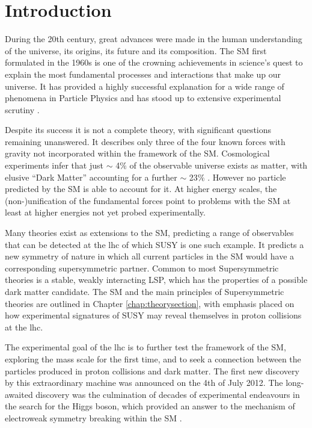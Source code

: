 \chapter{Introduction}
\label{chap:introduction}

During the 20th century, great advances were made in the human understanding of the universe, its origins, its future and its composition. The \acf{SM} first formulated in the 1960s is one of the crowning achievements in science's quest to explain the most fundamental processes and interactions that make up our universe. It has provided a highly successful explanation for a wide range of phenomena in Particle Physics and has stood up to extensive experimental scrutiny \cite{pdg2012}.

Despite its success it is not  a complete theory, with significant questions remaining unanswered. It describes only three of the four known forces with gravity not incorporated within the framework of the \ac{SM}. Cosmological experiments infer that just $\sim$ 4$\%$ of the observable universe exists as matter, with elusive ``Dark Matter'' accounting for a further $\sim$ 23$\%$ \cite{0067-0049-208-2-19}. However no particle predicted by the \ac{SM} is able to account for it.  At higher energy scales, the (non-)unification of the fundamental forces point to problems with the \ac{SM} at least at higher energies not yet probed experimentally. 

Many theories exist as extensions to the \ac{SM}, predicting a range of observables that can be detected at the \acf{lhc} of which \acf{SUSY} is one such example. It predicts a new symmetry of nature in which all current particles in the \ac{SM} would have a corresponding supersymmetric partner. Common to most Supersymmetric theories is a stable, weakly interacting \acf{LSP}, which has the properties of a possible dark matter candidate. The \ac{SM} and the main principles of Supersymmetric theories are outlined in Chapter \ref{chap:theorysection}, with emphasis placed on how experimental signatures of \ac{SUSY} may reveal themselves in proton collisions at the \ac{lhc}.

The experimental goal of the \ac{lhc} is to further test the framework of the \ac{SM}, exploring the \TeV mass scale for the first time, and to seek a connection between the particles produced in proton collisions and dark matter. The first new discovery by this extraordinary machine was announced on the 4th of July 2012. The long-awaited discovery was the culmination of decades of experimental endeavours in the search for the Higgs boson, which provided an answer to the mechanism of electroweak symmetry breaking within the \ac{SM} \cite{Aad:2012tfa}\cite{Chatrchyan:2012ufa}. 

